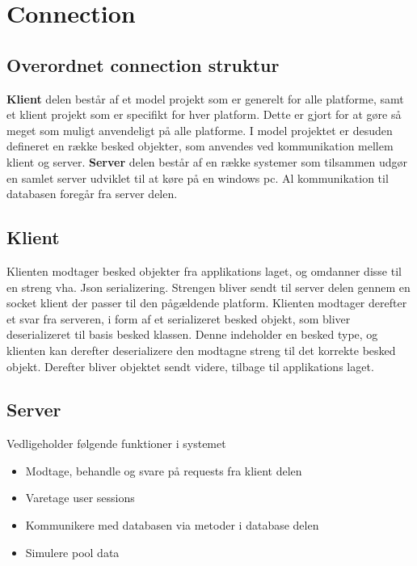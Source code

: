 \section{Connection}

\subsection{Overordnet connection struktur}
\textbf{Klient} delen består af et model projekt som er generelt for alle platforme, samt et klient projekt som er specifikt for hver platform. Dette er gjort for at gøre så meget som muligt anvendeligt på alle platforme. I model projektet er desuden defineret en række besked objekter, som anvendes ved kommunikation mellem klient og server.
\textbf{Server} delen består af en række systemer som tilsammen udgør en samlet server udviklet til at køre på en windows pc. Al kommunikation til databasen foregår fra server delen.

\subsection{Klient}
Klienten modtager besked objekter fra applikations laget, og omdanner disse til en streng vha. Json serializering. Strengen bliver sendt til server delen gennem en socket klient der passer til den pågældende platform.
Klienten modtager derefter et svar fra serveren, i form af et serializeret besked objekt, som bliver deserializeret til basis besked klassen. Denne indeholder en besked type, og klienten kan derefter deserializere den modtagne streng til det korrekte besked objekt. Derefter bliver objektet sendt videre, tilbage til applikations laget. 

\subsection{Server}
Vedligeholder følgende funktioner i systemet
\begin{itemize}
	\item Modtage, behandle og svare på requests fra klient delen
	\item Varetage user sessions
	\item Kommunikere med databasen via metoder i database delen
	\item Simulere pool data
\end{itemize}

